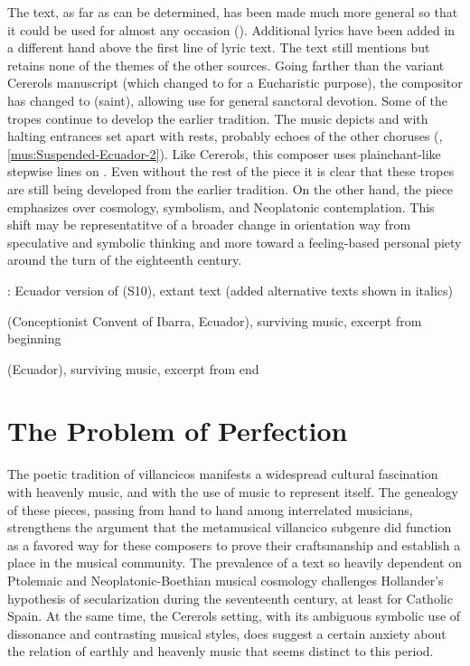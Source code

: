 The text, as far as can be determined, has been made much more general so that
it could be used for almost any occasion ().
Additional lyrics have been added in a different hand above the first line of
lyric text.
The text still mentions  but retains none of the themes of the
other sources.
Going farther than the variant Cererols manuscript (which changed 
to  for a Eucharistic purpose), the compositor has changed
 to  (saint), allowing use for general sanctoral
devotion.
Some of the tropes continue to develop the earlier tradition.
The music depicts  and  with halting
entrances set apart with rests, probably echoes of the other choruses
(, \ref{mus:Suspended-Ecuador-2}).
Like Cererols, this composer uses plainchant-like stepwise lines on .
Even without the rest of the piece it is clear that these tropes are still being
developed from the earlier tradition.
On the other hand, the piece emphasizes  over
cosmology, symbolism, and Neoplatonic contemplation.
This shift may be representatitve of a broader change in orientation way from
speculative and symbolic thinking and more toward a feeling-based personal
piety around the turn of the eighteenth century.

{: Ecuador version of 
(S10), extant text (added alternative texts shown in italics)}

{ (Conceptionist Convent of Ibarra, Ecuador),
surviving music, excerpt from beginning}

{ (Ecuador), surviving music, excerpt from end}


\section{The Problem of Perfection}

The poetic tradition of  villancicos manifests a
widespread cultural fascination with heavenly music, and with the use of music
to represent itself.
The genealogy of these pieces, passing from hand to hand among interrelated
musicians, strengthens the argument that the metamusical villancico subgenre did
function as a favored way for these composers to prove their craftsmanship and
establish a place in the musical community.
The prevalence of a text so heavily dependent on Ptolemaic and
Neoplatonic-Boethian musical cosmology challenges Hollander's hypothesis of
secularization during the seventeenth century, at least for Catholic Spain.
At the same time, the Cererols setting, with its ambiguous symbolic use of
dissonance and contrasting musical styles, does suggest a certain anxiety about
the relation of earthly and heavenly music that seems distinct to this period.

